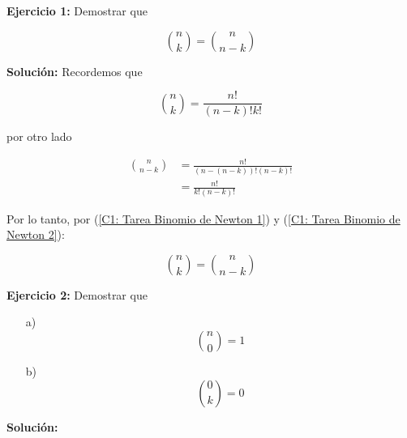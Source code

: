 
\noindent \textbf{Ejercicio 1:} Demostrar que

\begin{equation*}
    \binom{n}{k} = \binom{n}{n-k}
\end{equation*}

\noindent \textbf{Solución: } Recordemos que

\begin{equation}
    \binom{n}{k} = \frac{n!}{(n-k)! k!}
    \label{C1: Tarea Binomio de Newton 1}
\end{equation}

\noindent por otro lado

\begin{equation}
    \begin{split}
        \binom{n}{n-k} & = \frac{n!}{(n-(n-k))! (n-k)!} \\
        & = \frac{n!}{k!(n-k)!}
    \end{split}
    \label{C1: Tarea Binomio de Newton 2}
\end{equation}

\noindent Por lo tanto, por (\ref{C1: Tarea Binomio de Newton 1}) y (\ref{C1: Tarea Binomio de Newton 2}):

\begin{equation}
    \binom{n}{k} = \binom{n}{n-k}
\end{equation}


\noindent \textbf{Ejercicio 2:} Demostrar que

\begin{itemize}
    \item [a) ]
    \begin{equation*}
        \binom{n}{0} = 1
    \end{equation*}

    \item[b) ] 
    \begin{equation*}
        \binom{0}{k} = 0
    \end{equation*}
\end{itemize}

\noindent \textbf{Solución: } 

